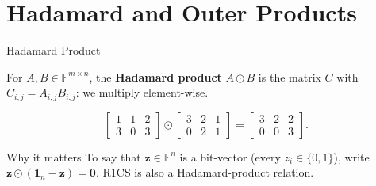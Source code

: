 \documentclass{zkdl-presentation-template}
\begin{document}
    \section{Hadamard and Outer Products}

    \begin{frame}{Hadamard Product}
        \begin{definition}
            For $A,B \in \mathbb{F}^{m \times n}$, the \textbf{Hadamard product} $A \odot B$ is the matrix $C$ with $C_{i,j} = A_{i,j}B_{i,j}$: we multiply element-wise.
        \end{definition}
        \pause

        \begin{example}
            \begin{equation*}
                \begin{bmatrix}
                    1 & 1 & 2 \\
                    3 & 0 & 3
                \end{bmatrix} \odot \begin{bmatrix}
                    3 & 2 & 1 \\ 0 & 2 & 1
                \end{bmatrix} = \begin{bmatrix}
                    3 & 2 & 2 \\
                    0 & 0 & 3
                \end{bmatrix}.
            \end{equation*}
        \end{example}
        \pause

        \begin{remarkblock}{Why it matters}
            To say that $\mathbf{z} \in \mathbb{F}^n$ is a bit-vector (every $z_i \in \{0,1\}$), write $\mathbf{z} \odot (\mathbf{1}_n - \mathbf{z}) = \mathbf{0}$. R1CS is also a Hadamard-product relation.
        \end{remarkblock}
    \end{frame}
\end{document}

